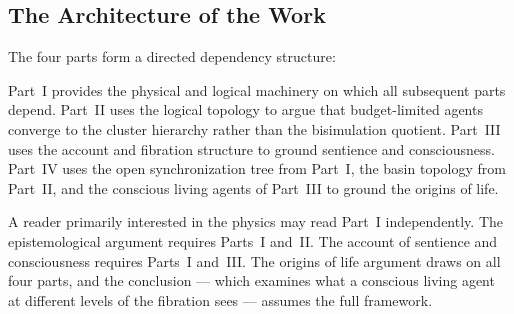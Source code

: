 \documentclass[12pt,openright,twoside]{book}
\theoremstyle{remark}
\begin{document}
\bigskip

\subsection*{The Architecture of the Work}

The four parts form a directed dependency structure:

\begin{center}
\end{center}

Part~I provides the physical and logical machinery on which all
subsequent parts depend.
Part~II uses the logical topology to argue that budget-limited
agents converge to the cluster hierarchy rather than the
bisimulation quotient.
Part~III uses the account and fibration structure to ground
sentience and consciousness.
Part~IV uses the open synchronization tree from Part~I, the basin
topology from Part~II, and the conscious living agents of Part~III
to ground the origins of life.

A reader primarily interested in the physics may read Part~I
independently.
The epistemological argument requires Parts~I and~II.
The account of sentience and consciousness requires Parts~I
and~III.
The origins of life argument draws on all four parts, and the
conclusion --- which examines what a conscious living agent at
different levels of the fibration sees --- assumes the full
framework.
\end{document}
